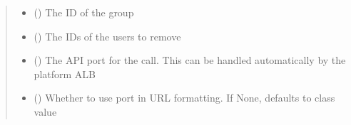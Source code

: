 \documentclass[letterpaper,10pt,english]{sphinxmanual}
\begin{document}
\begin{fulllineitems}
\begin{fulllineitems}
\begin{sphinxVerbatim}[commandchars=\\\{\}]
 
  
 \PYG{p}{[} \PYG{p}{]}
\end{sphinxVerbatim}
\begin{quote}\begin{description}
\begin{itemize}
\item {} 
\sphinxAtStartPar
{} () \textendash{} The ID of the group

\item {} 
\sphinxAtStartPar
{} () \textendash{} The IDs of the users to remove

\item {} 
\sphinxAtStartPar
{} (\sphinxstyleliteralemphasis{\sphinxupquote{ (}}\sphinxstyleliteralemphasis{\sphinxupquote{)}}) \textendash{} The API port for the call. This can be handled automatically by the platform ALB

\item {} 
\sphinxAtStartPar
{} (\sphinxstyleliteralemphasis{\sphinxupquote{ (}}\sphinxstyleliteralemphasis{\sphinxupquote{)}}) \textendash{} Whether to use port in URL formatting. If None, defaults to class value


\end{itemize}
\end{description}
\end{quote}
\end{fulllineitems}
\end{fulllineitems}
\end{document}
